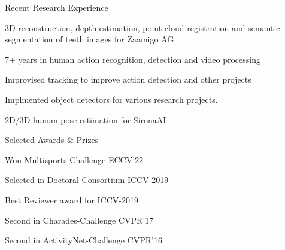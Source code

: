 \documentclass{resume} %
\begin{document}
\begin{paracol}{2}
\begin{rSection}{Recent Research Experience}{} 
\begin{sSubsection}{3D-reconstruction, depth estimation, point-cloud registration and semantic segmentation of teeth images for Zaamigo AG}\end{sSubsection}
\begin{sSubsection}{7+ years in human action recognition, detection and  video processing}\end{sSubsection}
\begin{sSubsection}{Improvised tracking to improve action detection and other projects}\end{sSubsection}
\begin{sSubsection}{Implmented object detectors for various research projects.}\end{sSubsection}
\begin{sSubsection}{2D/3D human pose estimation for SironaAI}\end{sSubsection}
\end{rSection}
\switchcolumn
\begin{rSection}{Selected Awards \& Prizes}{}
\begin{sSubsection}{Won Multisports-Challenge ECCV'22}\end{sSubsection} %
\begin{sSubsection}{Selected in Doctoral Consortium ICCV-2019}\end{sSubsection}  %
\begin{sSubsection}{Best Reviewer award for ICCV-2019}\end{sSubsection} %
\begin{sSubsection}{Second in Charades-Challenge CVPR'17}\end{sSubsection} %
\begin{sSubsection}{Second in ActivityNet-Challenge CVPR'16}\end{sSubsection} %
\end{rSection}


\end{paracol}
\end{document}
